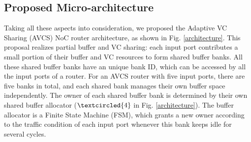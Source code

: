 \documentclass[10pt,conference]{IEEEtran}
\begin{document}
\subsection{Proposed Micro-architecture}
Taking all these aspects into consideration, we proposed the Adaptive VC Sharing (AVCS) NoC router architecture, as shown in Fig. \ref{architecture}. This proposal realizes partial buffer and VC sharing: each input port contributes a small portion of their buffer and VC resources to form shared buffer banks. All these shared buffer banks have an unique bank ID, which can be accessed by all the input ports of a router. For an AVCS router with five input ports, there are five banks in total, and each shared bank manages their own buffer space independently. The owner of each shared buffer bank is determined by their own shared buffer allocator ($\textcircled{4}$ in Fig. \ref{architecture}). The buffer allocator is a Finite State Machine (FSM), which grants a new owner according to the traffic condition of each input port whenever this bank keeps idle for several cycles.
\end{document}
